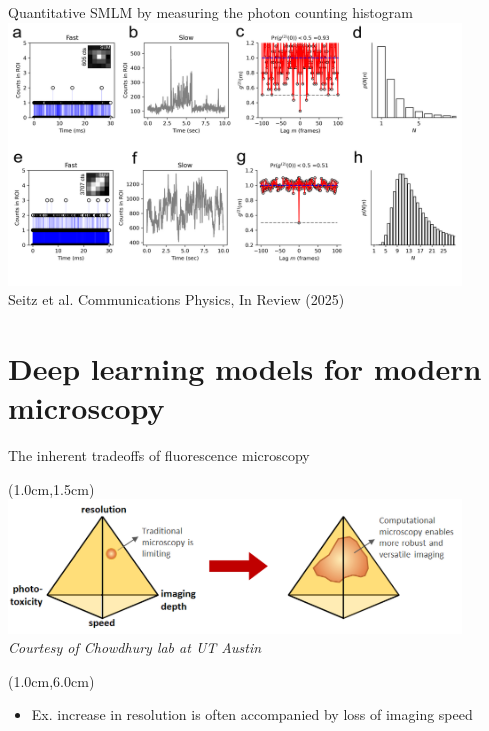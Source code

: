 \documentclass{beamer}					%
\begin{document}
\begin{frame}{Quantitative SMLM by measuring the photon counting histogram}
\includegraphics[width=12cm]{../../phd/spad/spad/media/Figure-1.png}
\\Seitz et al. Communications Physics, In Review (2025)
\end{frame}


\section{Deep learning models for modern microscopy}


\begin{frame}{The inherent tradeoffs of fluorescence microscopy}
\begin{textblock*}{12cm}(1.0cm,1.5cm)
\includegraphics[width=12cm]{../../postdoc/sartorius/media/Tradeoff.png}
\emph{Courtesy of Chowdhury lab at UT Austin}
\end{textblock*}
\begin{textblock*}{12cm}(1.0cm,6.0cm)
\begin{itemize}
\item Ex. increase in resolution is often accompanied by loss of imaging speed
\end{itemize}
\end{textblock*}
\end{frame}
\end{document}
